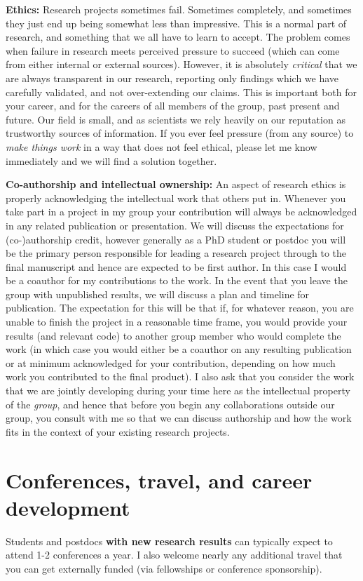 \documentclass{classassignments}
\begin{document}
\noindent\textbf{Ethics:} Research projects sometimes fail. Sometimes completely, and sometimes they just end up being somewhat less than impressive. This is a normal part of research, and something that we all have to learn to accept. The problem comes when failure in research meets perceived pressure to succeed (which can come from either internal or external sources). However, it is absolutely \textit{critical} that we are always transparent in our research, reporting only findings which we have carefully validated, and not over-extending our claims. This is important both for your career, and for the careers of all members of the group, past present and future. Our field is small, and as scientists we rely heavily on our reputation as trustworthy sources of information. If you ever feel pressure (from any source) to \textit{make things work} in a way that does not feel ethical, please let me know immediately and we will find a solution together.\bigskip

\noindent\textbf{Co-authorship and intellectual ownership:} An aspect of research ethics is properly acknowledging the intellectual work that others put in. Whenever you take part in a project in my group your contribution will always be acknowledged in any related publication or presentation. We will discuss the expectations for (co-)authorship credit, however generally as a PhD student or postdoc you will be the primary person responsible for leading a research project through to the final manuscript and hence are expected to be first author. In this case I would be a coauthor for my contributions to the work. In the event that you leave the group with unpublished results, we will discuss a plan and timeline for publication. The expectation for this will be that if, for whatever reason, you are unable to finish the project in a reasonable time frame, you would provide your results (and relevant code) to another group member who would complete the work (in which case you would either be a coauthor on any resulting publication or at minimum acknowledged for your contribution, depending on how much work you contributed to the final product). I also ask that you consider the work that we are jointly developing during your time here as the intellectual property of the \textit{group}, and hence that before you begin any collaborations outside our group, you consult with me so that we can discuss authorship and how the work fits in the context of your existing research projects.


\section{Conferences, travel, and career development}
Students and postdocs \textbf{with new research results} can typically expect to attend 1-2 conferences a year. I also welcome nearly any additional travel that you can get externally funded (via fellowships or conference sponsorship).\medskip
\end{document}
